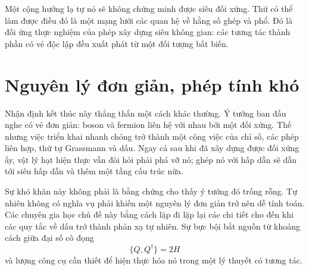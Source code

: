 \begin{classroomqa}
\end{classroomqa}

Một cộng hưởng lạ tự nó sẽ không chứng minh được siêu đối xứng. Thứ có thể làm được điều đó là một mạng lưới các quan hệ về hằng số ghép và phổ. Đó là đối ứng thực nghiệm của phép xây dựng siêu không gian: các tương tác thành phần có vẻ độc lập đều xuất phát từ một đối tượng bất biến.

\begin{classroomqa}
\end{classroomqa}

\section{Nguyên lý đơn giản, phép tính khó}

Nhận định kết thúc này thẳng thắn một cách khác thường. Ý tưởng ban đầu nghe có vẻ đơn giản: boson và fermion liên hệ với nhau bởi một đối xứng. Thế nhưng việc triển khai nhanh chóng trở thành một công việc của chỉ số, các phép liên hợp, thứ tự Grassmann và dấu. Ngay cả sau khi đã xây dựng được đối xứng ấy, vật lý hạt hiện thực vẫn đòi hỏi phải phá vỡ nó; ghép nó với hấp dẫn sẽ dẫn tới siêu hấp dẫn và thêm một tầng cấu trúc nữa.

Sự khó khăn này không phải là bằng chứng cho thấy ý tưởng đó trống rỗng. Tự nhiên không có nghĩa vụ phải khiến một nguyên lý đơn giản trở nên dễ tính toán. Các chuyên gia học chủ đề này bằng cách lặp đi lặp lại các chi tiết cho đến khi các quy tắc về dấu trở thành phản xạ tự nhiên. Sự bực bội bắt nguồn từ khoảng cách giữa đại số cô đọng
\begin{equation}
\{Q,Q^\dagger\}=2H
\end{equation}
và lượng công cụ cần thiết để hiện thực hóa nó trong một lý thuyết có tương tác.

